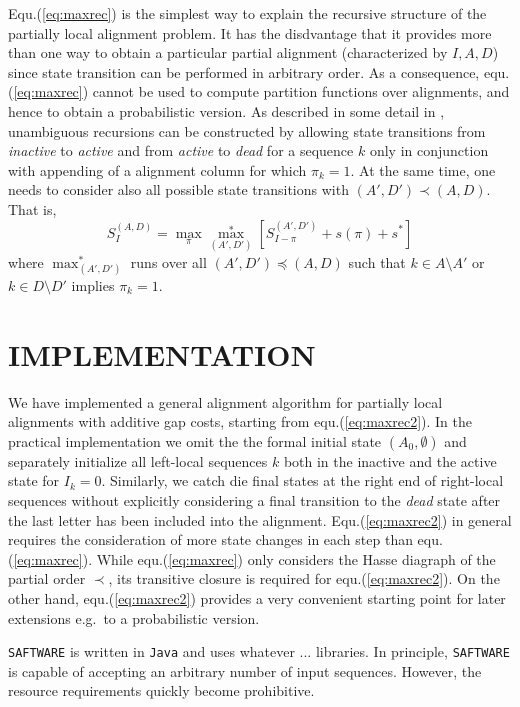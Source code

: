\documentclass[a4paper,10pt]{article}
\newcommand{\TODO}[1]{\begingroup\color{red}#1\endgroup}
\newcommand{\SAFTWARE}{\TODO{\texttt{SAFTWARE}}}
\begin{document}
Equ.(\ref{eq:maxrec}) is the simplest way to explain the recursive
structure of the partially local alignment problem. It has the disdvantage
that it provides more than one way to obtain a particular partial alignment
(characterized by $I,A,D$) since state transition can be performed in
arbitrary order. As a consequence, equ.(\ref{eq:maxrec}) cannot be used to
compute partition functions over alignments, and hence to obtain a
probabilistic version. As described in some detail in \citet{Retzlaff:18a},
unambiguous recursions can be constructed by allowing state transitions
from \textit{inactive} to \textit{active} and from \textit{active} to
\textit{dead} for a sequence $k$ only in conjunction with appending of a
alignment column for which $\pi_k=1$.  At the same time, one needs to
consider also all possible state transitions with $(A',D')\prec(A,D)$. That
is,
\begin{equation}
  S^{(A,D)}_I = 
  \displaystyle\max_{\pi} \displaystyle\max_{(A',D')}^*
  \left[ S^{(A',D')}_{I-\pi} + s(\pi) + s^* \right]
  \label{eq:maxrec2}
\end{equation}
where $\max_{(A',D')}^*$ runs over all $(A',D')\preceq(A,D)$ such that
$k\in A\setminus A'$ or $k\in D\setminus D'$ implies $\pi_k=1$.

\section{\uppercase{Implementation}}

We have implemented a general alignment algorithm for partially local
alignments with additive gap costs, starting from
equ.(\ref{eq:maxrec2}). In the practical implementation we omit the the
formal initial state $(A_0,\emptyset)$ and separately initialize all
left-local sequences $k$ both in the inactive and the active state for
$I_k=0$. Similarly, we catch die final states at the right end of
right-local sequences without explicitly considering a final transition to
the \textit{dead} state after the last letter has been included into the
alignment. Equ.(\ref{eq:maxrec2}) in general requires the consideration of
more state changes in each step than equ.(\ref{eq:maxrec}). While
equ.(\ref{eq:maxrec}) only considers the Hasse diagraph of the partial
order $\prec$, its transitive closure is required for
equ.(\ref{eq:maxrec2}). On the other hand, equ.(\ref{eq:maxrec2}) provides
a very convenient starting point for later extensions e.g.\ to a
probabilistic version. 

  
\SAFTWARE{} is written in \TODO{\texttt{Java} and uses whatever
  ... libraries}.  In principle, \SAFTWARE{} is capable of accepting an
arbitrary number of input sequences. However, the resource requirements
quickly become prohibitive.
\end{document}
